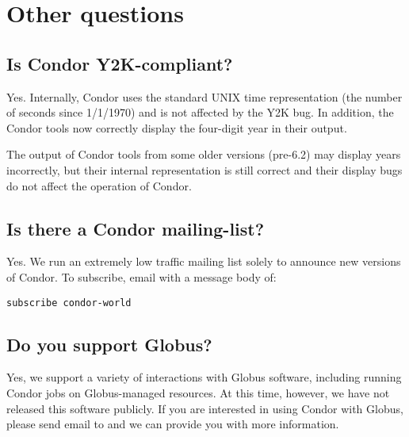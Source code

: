 
\section{Other questions}

\subsection{Is Condor Y2K-compliant?}

Yes.
Internally, Condor uses the standard UNIX time representation (the
number of seconds since 1/1/1970) and is not affected by the Y2K bug.
In addition, the Condor tools now correctly display the four-digit
year in their output.

The output of Condor tools from some older versions (pre-6.2) may
display years incorrectly, but their internal representation is still
correct and their display bugs do not affect the operation of Condor.


\subsection{Is there a Condor mailing-list?}

Yes.
We run an extremely low traffic mailing list solely to announce new
versions of Condor.
To subscribe, email  with a message body
of:

\begin{verbatim}subscribe condor-world\end{verbatim}


\subsection{Do you support Globus?}

Yes, we support a variety of interactions with Globus software,
including running Condor jobs on Globus-managed resources.
At this time, however, we have not released this software publicly.
If you are interested in using Condor with Globus, please send email
to  and we can provide you with more
information.

